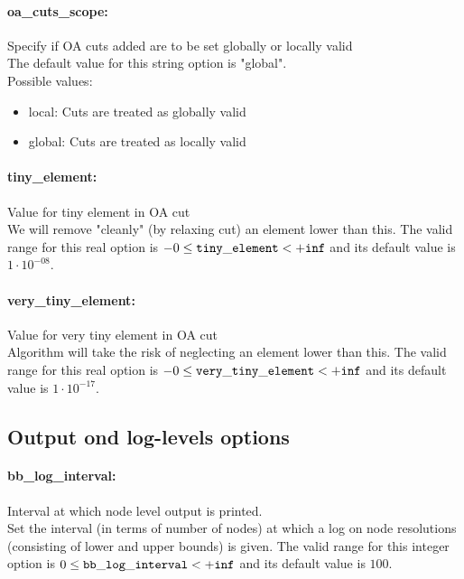 \paragraph{oa\_cuts\_scope:}\label{sec:oa_cuts_scope} Specify if OA cuts added are to be set globally or locally valid $\;$ \\

The default value for this string option is "global".
\\ 
Possible values:
\begin{itemize}
   \item local: Cuts are treated as globally valid
   \item global: Cuts are treated as locally valid
\end{itemize}

\paragraph{tiny\_element:}\label{sec:tiny_element} Value for tiny element in OA cut $\;$ \\
 We will remove "cleanly" (by relaxing cut) an
element lower than this. The valid range for this real option is 
$-0 \le {\tt tiny\_element } <  {\tt +inf}$
and its default value is $1 \cdot 10^{-08}$.


\paragraph{very\_tiny\_element:}\label{sec:very_tiny_element} Value for very tiny element in OA cut $\;$ \\
 Algorithm will take the risk of neglecting an
element lower than this. The valid range for this real option is 
$-0 \le {\tt very\_tiny\_element } <  {\tt +inf}$
and its default value is $1 \cdot 10^{-17}$.


\subsection{Output ond log-levels options}
\label{sec:Output_ond_log-levels_options}
\paragraph{bb\_log\_interval:}\label{sec:bb_log_interval} Interval at which node level output is printed. $\;$ \\
 Set the interval (in terms of number of nodes) at
which a log on node resolutions (consisting of
lower and upper bounds) is given. The valid range for this integer option is
$0 \le {\tt bb\_log\_interval } <  {\tt +inf}$
and its default value is $100$.


